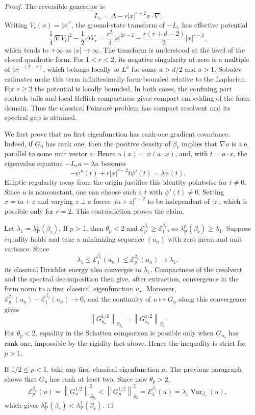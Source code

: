 \documentclass{article}
\newcommand{\norm}[1]{\left\lVert #1 \right\rVert}
\begin{document}
\begin{proof}
The reversible generator is
\[
    L_r=\Delta-r |x|^{r-2}x\cdot\nabla .
\]
Writing $V_r(x)=|x|^r$, the ground-state transform of $-L_r$ has effective
potential
\[
    \frac14|\nabla V_r|^2-\frac12\Delta V_r
    =
    \frac{r^2}{4}|x|^{2r-2}
    -\frac{r(r+d-2)}{2}|x|^{r-2},
\]
which tends to $+\infty$ as $|x|\to\infty$. The transform is understood at
the level of the closed quadratic form. For $1<r<2$, its negative singularity
at zero is a multiple of $|x|^{-(2-r)}$, which belongs locally to $L^a$ for
some $a>d/2$ and $a>1$. Sobolev estimates make this term infinitesimally
form-bounded relative to the Laplacian. For $r\ge2$ the potential is locally
bounded. In both cases, the confining part controls tails and local Rellich
compactness gives compact embedding of the form domain. Thus the classical
Poincar\'e problem has compact resolvent and its spectral gap is attained.

We first prove that no first eigenfunction has rank-one gradient covariance.
Indeed, if $G_u$ has rank one, then the positive density of $\beta_r$ implies
that $\nabla u$ is a.e. parallel to some unit vector $a$.  Hence
$u(x)=\psi(a\cdot x)$, and, with $t=a\cdot x$, the eigenvalue equation
$-L_r u=\lambda u$ becomes
\[
    -\psi''(t)+r |x|^{r-2}t\psi'(t)=\lambda\psi(t).
\]
Elliptic regularity away from the origin justifies this identity pointwise
for $t\ne0$. Since $u$ is nonconstant, one can choose such a $t$ with
$\psi'(t)\ne0$. Setting
$x=ta+z$ and varying $z\perp a$ forces $|ta+z|^{r-2}$ to be independent of
$|z|$, which is possible only for $r=2$.  This contradiction proves the
claim.

Let $\lambda_1=\lambda_{\mathrm P}^{1}(\beta_r)$. If $p>1$, then
$\theta_p<2$ and $\mathcal E_p^{\beta_r}\ge\mathcal E_1^{\beta_r}$, so
$\lambda_{\mathrm P}^{p}(\beta_r)\ge\lambda_1$. Suppose equality holds and
take a minimizing sequence $(u_n)$ with zero mean and unit variance.  Since
\[
    \lambda_1
    \le \mathcal E_1^{\beta_r}(u_n)
    \le \mathcal E_p^{\beta_r}(u_n)
    \longrightarrow \lambda_1,
\]
its classical Dirichlet energy also converges to $\lambda_1$.  Compactness of
the resolvent and the spectral decomposition then give, after extraction,
convergence in the form norm to a first classical eigenfunction $u_\star$.
Moreover,
$\mathcal E_p^{\beta_r}(u_n)-\mathcal E_1^{\beta_r}(u_n)\to0$, and the
continuity of $u\mapsto G_u$ along this convergence gives
\[
    \norm{G_{u_\star}^{1/2}}_{S_{\theta_p}}
    =
    \norm{G_{u_\star}^{1/2}}_{S_2}.
\]
For $\theta_p<2$, equality in the Schatten comparison is possible only when
$G_{u_\star}$ has rank one, impossible by the rigidity fact above.  Hence the
inequality is strict for $p>1$.

If $1/2\le p<1$, take any first classical eigenfunction $u$.  The previous
paragraph shows that $G_u$ has rank at least two.  Since now $\theta_p>2$,
\[
    \mathcal E_p^{\beta_r}(u)
    =
    \norm{G_u^{1/2}}_{S_{\theta_p}}^2
    <
    \norm{G_u^{1/2}}_{S_2}^2
    =
    \mathcal E_1^{\beta_r}(u)
    =
    \lambda_1\operatorname{Var}_{\beta_r}(u),
\]
which gives
$\lambda_{\mathrm P}^{p}(\beta_r)<\lambda_{\mathrm P}^{1}(\beta_r)$.
\end{proof}
\end{document}
